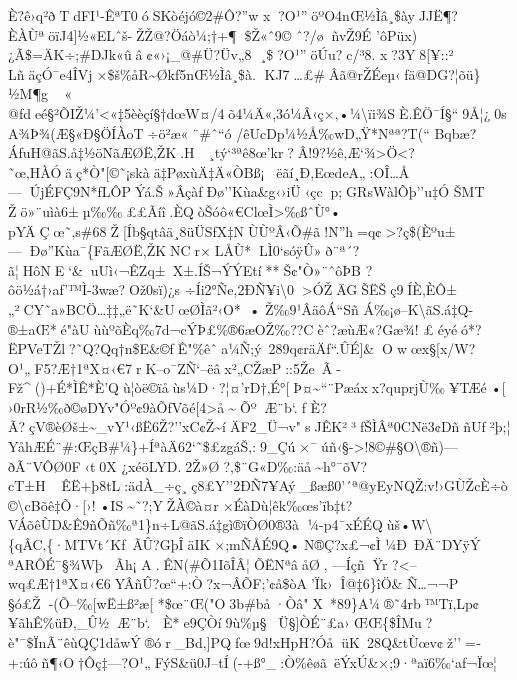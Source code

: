 È?ê›q²ðTdFI¹-ÊªT0óSKòéjó©2\#Ô?''w
x?O¹''öºO4nŒ½Ìâ¸\$àyJJË¶?ÈÀÙªö\textquotesingle ïJ4{]}½«ELˆš-ŽŽ@?Öáò¼;†+¶\$Ž«ˆ9©
ˆ?/øñvŽ9É 'ôPüx)¿Ã\$=ÄK÷;\#DJ\textbar k«ûâ¢«›¡\_@\#Ü?Üv„8
¸\$?O¹''öÚu?c/³8. x?3Y8{[}¥::²
L\textbar ñäçÓ¯e4ÎVj×\$š\textquotesingle\%åR\textasciitilde Økƒ5nŒ½Ìâ¸\$à.
KJ7\ldots£\#Âã@rŽÉeµ‹ƒä@DG?¦õü\}½M¶g «
@fdeé§²ÕIŽ¼'\textless«‡5èèçí§†dœW¤/4õ4¼Ä«,3ó¼Â‹ç×‚•¼\textbackslash\textbar ïi¾SÈ.ÊÖ¯Í§``9Å¦¿0sA¾Þ¾(Æ§«Ð§ÖÍÀoT÷ö²æ«¨\#ˆ``ó
/êUcDp¼½Å‰wD„Ÿ*Nªª?T(``
­Bqbæ?ÁfuH@ãS.å‡½öNãÆØË,ŽK.H~~¸tý`³ªê8œ'kr?Â!9?½ê‚Æ`¾\textgreater Ö\textless?˜œ‚HÀÓäç*Ò"{[}©˜¡skàä‡­PøxùÄ‡Ä«ÒBß¡ëãí¸Ð,EœdeA„:OÎ\ldots Å---ÚjÉFÇ9\textquotesingle N*ƒLÔPÝá.Š»ÂçàfÐø''Kùa\&g‹›iÜ‹çcp;GRsWàlÕþ''u‡Ó
ŠMT Žö»¨uìà6±µ‰‰££Ãíî.ÈQòŠóô«€ClœÌ\textgreater‰ßˆÙ°•
pYÄÇœ˜‚s\#68Ž{[}Íb§qtâä¸8ü\textbar ÜSfX‡N\textquotesingle ÙÙºÂ‹Õ\#ã!N''h=q¢\textgreater?ç\$(Èºu±---Ðø''Kùa¯\{FãÆØË,ŽKNC r×LÅÙ*LÌ0`sóÿÛ»ð¨ª´?ã¦H\textquotesingle ôNE`\&uUì‹¬ÊZq±~X±.ÍŠ¬ÝÝEtí**Š¢"Ò»¨ˆôÞB
?ôö½á†›af'™Ì-3wæ?Ož0sï)¿s
÷Íi2°Ñ­e‚2ÐÑ¥i\textbackslash0\textgreater ÓŽÄGŠËŠç9ÍÈ,ÈÔ±„²CY˜a»BCÖ\ldots‡‡„ë˜K`\&UœØÌã²‹O*
• Ž‰9¹ÂäôÁ``Sñ
Á‰¡ø--K\textbackslash ãS.á‡Q-®±aŒ*é"àUùùºõÈq‰7d¬cÝÞ£\%®6æOŽ‰??Cèˆ?æùÆ«?Gæ¾!
£éyéó*?ËPVeTŽl?˜Q?Qq†n\textquotesingle{]}\$E\&©ƒÊ"\%êˆa¼Ñ;ý~289q¢räÄf``.ÛÉ{]}\&\textquotesingle\textquotesingleO\textquotesingle wœx§{[}x/W?O¹„F5?Æ†1ªX¤‹€7rK--o¯ZÑ`--ëâx²„CŽæP::5Že~Ã-Fž\^{}()+É*ÌÊ*È'Qù¦òë©ïåùs¼D·?¦¤'rD†,É°{[}Þ¤\textasciitilde``¨Pæáx­x?quprjÙ‰¥TÆ\textquotesingle é•{[}
›0rR½‰ð©øDYv"Óº¢9àÕƒVõé{[}4\textgreater å\textasciitildeÕºÆ¨b`.f
È?Ã?çV®èØš±\textasciitilde\_vY¹‹ßË6Ž?''xC¢Ž\textasciitilde íÄF2\_Ü¬v"sJÊK²³ƒŠÌÂª0CNë3¢DññUƒ²þ;¦YåhÆÉ¨\#:ŒçB\#¼\}+ÍªàÄ62`˜\$£zgáŠ‚:9\_Çú×¯úñ‹§-\textgreater!8©\#§O\textbackslash®ñ)---ðÃ¨VÔØ0F‹t0X
\textquotesingle¿xéöLYD.2Ž»Ø?,\$¨G«D‰:äå\textasciitilde h°¯õV?cT±HÊË+þ8tL:ädÀ\_÷ç¸ç8£Y\textbar''2ÐÑ7¥Aý\_ßæß 0'´ª@yEyNQŽ:v!›GÙŽcÈ÷ò©\textbackslash cBõê‡Õ·{[}›!•IS\textasciitilde˜?;YŽÀ©à¤r×ÉàDù¦êk‰œs'ïb‡t?VÁõêÙD\&Ê9ñÕñ‰\textbar ª1\}n÷L@ãS.á‡gì®ïÒØ0®3à
¼-p4¯xÉÉQùš•W\textbackslash\{qÂC‚\{·MTVt´Kf~ÃÛ?GþÎäIK×;mÑÅÉ9Q•N®Ç?x£¬¢Ì¼Ð~ÐÄ¨DYÿÝ
ªARÔÉ¯§¾WþÃh¡
A.ÊN(\#\textquotesingle Õ1IõÎÂ¦\textquotesingle ÕËNªâåØ‚---ÍçñŸr
?\textless--wq£Æ†1ªX¤‹€6YÂñÛ?œ``+:Ò?x¬ÂÕF;­'¢å\$òA'Ïk›Î@‡6\}îÖ\&
Ñ\ldots¬¬P §ó£Ž-­(Õ--‰{[}wË±ß²æ{[}
*\$œ¨Œ("O3b\#bå·Òâ"\textbar X~*89\}A¼®˜4rb™Tï,Lp¢¥ãh\textbar Ê\%üÐ‚\_Û½Æ¨b`.
È*e9ÇÒí9ù\%µ§Ü§{]}ÒÉ¨£a›ŒŒ\{\$ÎMu?è"¯\$ÏnÃ¨êùQ\textquotesingle Ç1dåwÝ®ór\_Bd‚{]}PQfœ9d!xHpH?ÓåüK~28Q\&tÙœv¢ž''=­+:úôñ¶‹O†Ôç‡---?O¹„FýS\&ü0J--tÍ(-+ß°\_:Ò\%êøã~ëÝxÚ\&×;9·ªaï6‰`af¬Ïœ¦
